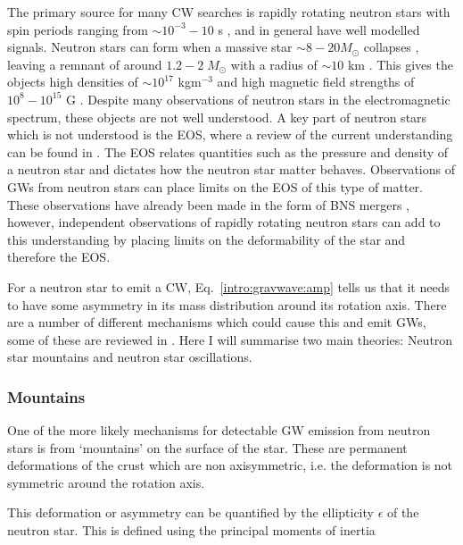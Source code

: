 The primary source for many \gls{CW} searches is rapidly rotating neutron
stars with spin periods ranging from $\sim 10^{-3} - 10$ s
\citep{manchester2005AustraliaTelescope}, and in general have well modelled signals.  Neutron stars can form when a
massive star $\sim 8 - 20 M_{\odot}$ collapses \citep{fryer2005NeutronStar}, leaving a remnant of around $1.2-2 \;
M_{\odot}$ with a radius of $\sim 10$ km \citep{ozel2016MassesRadii}. 
This gives the objects high densities of $\sim 10^{17}$ kgm$^{-3}$ and high magnetic field strengths of $10^8 - 10^{15}$ G \citep{konar2017MagneticFields}.  
Despite many observations of neutron stars in the electromagnetic spectrum,
these objects are not well understood.  A key part of neutron stars which is
not understood is the \gls{EOS}, where a review of the current understanding can be
found in \cite{lattimer2016EquationState}.  The \gls{EOS} relates quantities
such as the pressure and density of a neutron star and dictates how the neutron
star matter behaves. Observations of \glspl{GW} from neutron stars can place
limits on the \gls{EOS} of this type of matter.  These observations have
already been made in the form of \gls{BNS} mergers
\citep{abbott2017GW170817Observation}, however, independent observations of
rapidly rotating neutron stars can add to this understanding by placing limits
on the deformability of the star and therefore the \gls{EOS}.

For a neutron star to emit a \gls{CW}, Eq.~\ref{intro:gravwave:amp} tells us that it needs to have some asymmetry in its mass distribution around its rotation axis.  There are a number of different mechanisms which
could cause this and emit \glspl{GW}, some of these are reviewed in
\citep{glampedakis2017GravitationalWaves,riles2017RecentSearches,haskell2015DetectingGravitational,lasky2015GravitationalWaves}.
Here I will summarise two main theories: Neutron star mountains and neutron
star oscillations.

\subsubsection{\label{intro:source:cw:mountain}Mountains}

One of the more likely mechanisms for detectable \gls{GW} emission from neutron
stars is from `mountains' on the surface of the star.  These are permanent
deformations of the crust which are non axisymmetric, i.e. the deformation is
not symmetric around the rotation axis.

This deformation or asymmetry can be quantified by the ellipticity $\epsilon$ of the neutron star.
This is defined using the principal moments of inertia

